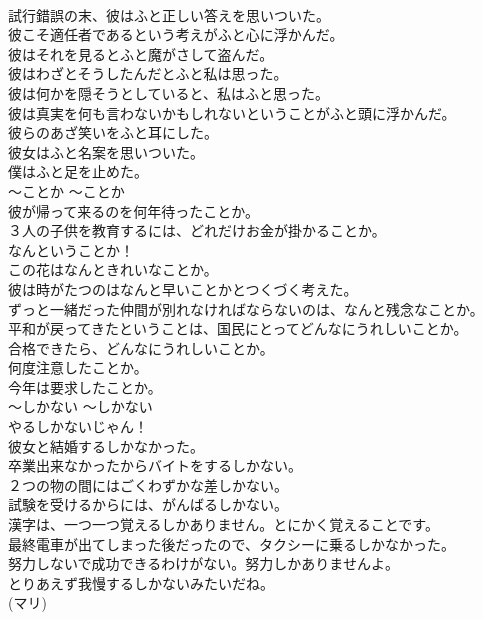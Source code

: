 \documentclass[8pt]{extreport}
\begin{document}
\begin{CJK}{UTF8}{min}
\\	試行錯誤の末、彼はふと正しい答えを思いついた。  
\\	彼こそ適任者であるという考えがふと心に浮かんだ。  
\\	彼はそれを見るとふと魔がさして盗んだ。  
\\	彼はわざとそうしたんだとふと私は思った。  
\\	彼は何かを隠そうとしていると、私はふと思った。  
\\	彼は真実を何も言わないかもしれないということがふと頭に浮かんだ。  
\\	彼らのあざ笑いをふと耳にした。  
\\	彼女はふと名案を思いついた。  
\\	僕はふと足を止めた。
\\	〜ことか	〜ことか	
\\	彼が帰って来るのを何年待ったことか。  
\\	３人の子供を教育するには、どれだけお金が掛かることか。  
\\	なんということか！  
\\	この花はなんときれいなことか。   
\\	彼は時がたつのはなんと早いことかとつくづく考えた。   
\\	ずっと一緒だった仲間が別れなければならないのは、なんと残念なことか。  
\\	平和が戻ってきたということは、国民にとってどんなにうれしいことか。  
\\	合格できたら、どんなにうれしいことか。   
\\	何度注意したことか。  
\\	今年は要求したことか。  
\\	〜しかない	〜しかない	
\\	やるしかないじゃん！  
\\	彼女と結婚するしかなかった。  
\\	卒業出来なかったからバイトをするしかない。  
\\	２つの物の間にはごくわずかな差しかない。   
\\	試験を受けるからには、がんばるしかない。  
\\	漢字は、一つ一つ覚えるしかありません。とにかく覚えることです。  
\\	最終電車が出てしまった後だったので、タクシーに乗るしかなかった。  
\\	努力しないで成功できるわけがない。努力しかありませんよ。  
\\	とりあえず我慢するしかないみたいだね。  
\\	(マリ)

\end{CJK}
\end{document}
